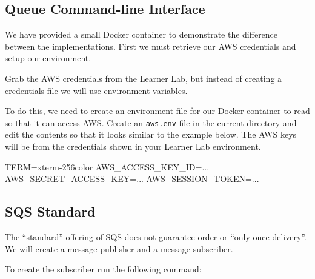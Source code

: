 \documentclass{csse4400}
\begin{document}
\subsection{Queue Command-line Interface}\label{sec:q-cli}

We have provided a small Docker container to demonstrate the difference between the implementations.
First we must retrieve our AWS credentials and setup our environment.

Grab the AWS credentials from the Learner Lab,
but instead of creating a credentials file we will use environment variables.

To do this, we need to create an environment file for our Docker container to read so that it can access AWS.
Create an \texttt{aws.env} file in the current directory and edit the contents so that it looks similar to the example below.
The AWS keys will be from the credentials shown in your Learner Lab environment.

\begin{code}[numbers=none]{}
TERM=xterm-256color
AWS_ACCESS_KEY_ID=...
AWS_SECRET_ACCESS_KEY=...
AWS_SESSION_TOKEN=...
\end{code}



\subsection{SQS Standard}

The ``standard'' offering of SQS does not guarantee order or ``only once delivery''. 
We will create a message publisher and a message subscriber.


To create the subscriber run the following command:
\end{document}
